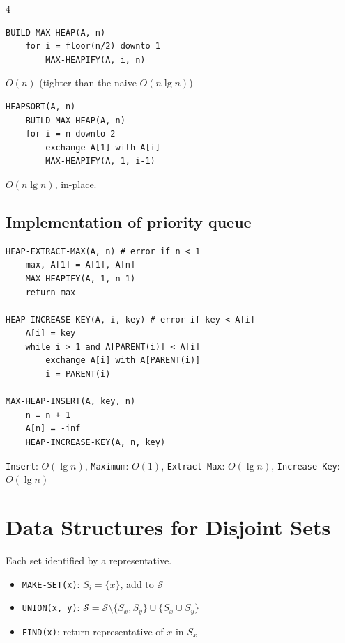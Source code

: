 \documentclass[8pt,a4paper,landscape]{extarticle}
\begin{document}
\begin{multicols*}{4}
\begin{lstlisting}
BUILD-MAX-HEAP(A, n)
    for i = floor(n/2) downto 1
        MAX-HEAPIFY(A, i, n)
\end{lstlisting}

\begin{prop}[title=Runtime]
$O(n)$ (tighter than the naive $O(n \lg n)$)
\end{prop}

\begin{lstlisting}
HEAPSORT(A, n)
    BUILD-MAX-HEAP(A, n)
    for i = n downto 2
        exchange A[1] with A[i]
        MAX-HEAPIFY(A, 1, i-1)
\end{lstlisting}

\begin{prop}[title=Runtime]
$O(n \lg n)$, in-place.
\end{prop}

\subsection{Implementation of priority queue}

\begin{lstlisting}
HEAP-EXTRACT-MAX(A, n) # error if n < 1
    max, A[1] = A[1], A[n]
    MAX-HEAPIFY(A, 1, n-1)
    return max

HEAP-INCREASE-KEY(A, i, key) # error if key < A[i]
    A[i] = key
    while i > 1 and A[PARENT(i)] < A[i]
        exchange A[i] with A[PARENT(i)]
        i = PARENT(i)

MAX-HEAP-INSERT(A, key, n)
    n = n + 1
    A[n] = -inf
    HEAP-INCREASE-KEY(A, n, key)
\end{lstlisting}

\begin{prop}[title=Runtimes]
\texttt{Insert}: $O(\lg n)$, \texttt{Maximum}: $O(1)$, \texttt{Extract-Max}: $O(\lg n)$, \texttt{Increase-Key}: $O(\lg n)$
\end{prop}

\section{Data Structures for Disjoint Sets}
Each set identified by a representative.

\begin{defn}[title=Operations]
\begin{itemize}
  \item \texttt{MAKE-SET(x)}: $S_i = \{x\}$, add to $\mathcal{S}$
  \item \texttt{UNION(x, y)}: $\mathcal{S} = \mathcal{S} \setminus \{S_x, S_y\} \cup \{S_x \cup S_y\}$
  \item \texttt{FIND(x)}: return representative of $x$ in $S_x$
\end{itemize}
\end{defn}


\end{multicols*}
\end{document}
